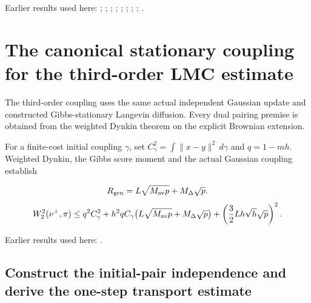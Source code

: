 \documentclass[11pt,a4paper]{report}
\begin{document}
Earlier results used here: \cite[Section~3.13.2]{LangevinLean2026ULASC}; \cite[Section~3.13.3]{LangevinLean2026ULASC}; \cite[Section~3.25.1]{LangevinLean2026ULASC}; \cite[Section~3.25.3]{LangevinLean2026ULASC}; \cite[Section~3.26.10]{LangevinLean2026ULASC}; \cite[Section~3.26.13]{LangevinLean2026ULASC}; \cite[Section~3.26.3]{LangevinLean2026ULASC}; \cite[Section~3.29.7]{LangevinLean2026ULASC}; \cite[Section~3.46.2]{LangevinLean2026ULASC}.
\section{\texorpdfstring{The canonical stationary coupling for the third-order LMC estimate}{The canonical stationary coupling for the third-order LMC estimate}}
\label{proof-module-AverageLMC-LaplacianCanonical-lean}


The third-order coupling uses the same actual independent Gaussian update and constructed Gibbs-stationary Langevin diffusion. Every dual pairing premise is obtained from the weighted Dynkin theorem on the explicit Brownian extension.



For a finite-cost initial coupling \(\gamma\), set \(C_\gamma^2=\int\|x-y\|^2\,d\gamma\) and \(q=1-mh\). Weighted Dynkin, the Gibbs score moment and the actual Gaussian coupling establish


\[R_{\rm gen}=L\sqrt{M_{\rm av}p}+M_\Delta\sqrt p.\]
\[W_2^2(\nu^+,\pi)\le q^2C_\gamma^2+h^2qC_\gamma\bigl(L\sqrt{M_{\rm av}p}+M_\Delta\sqrt p\bigr)+\left(\frac32Lh\sqrt h\sqrt p\right)^2.\]

Earlier results used here: \cite[Section~3.45]{LangevinLean2026ULASC}.
\subsection{\texorpdfstring{Construct the initial-pair independence and derive the one-step transport estimate}{Construct the initial-pair independence and derive the one-step transport estimate}}
\label{report-step-AverageLMC-LaplacianCanonical-lean-1}
\end{document}
